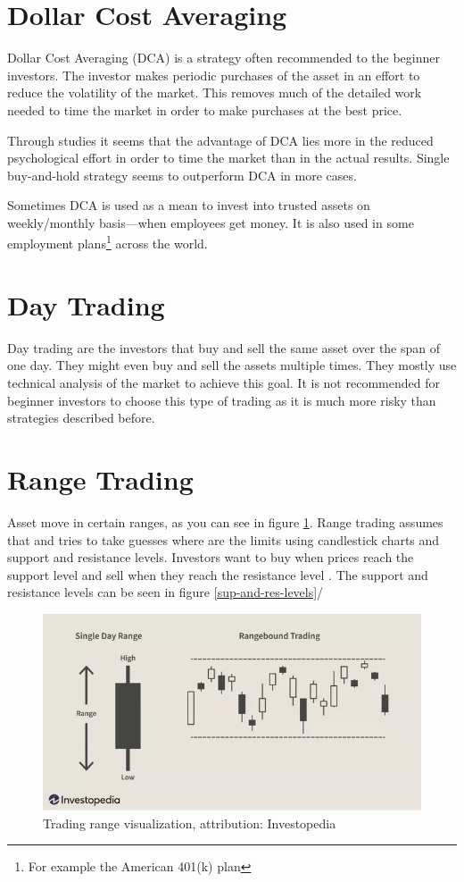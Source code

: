 \section{Dollar Cost Averaging}
Dollar Cost Averaging (DCA) is a strategy often recommended to the beginner investors. The investor makes periodic purchases of the asset in an effort to reduce the volatility of the market. This removes much of the detailed work needed to time the market in order to make purchases at the best price.

Through studies \cite{DCA-study} it seems that the advantage of DCA lies more in the reduced psychological effort in order to time the market than in the actual results. Single buy-and-hold strategy seems to outperform DCA in more cases.

Sometimes DCA is used as a mean to invest into trusted assets on weekly/monthly basis---when employees get money. It is also used in some employment plans\footnote{For example the American 401(k) plan} across the world.

\section{Day Trading}
Day trading are the investors that buy and sell the same asset over the span of one day. They might even buy and sell the assets multiple times. They mostly use technical analysis of the market to achieve this goal. It is not recommended for beginner investors to choose this type of trading as it is much more risky than strategies described before.

\section{Range Trading}
Asset move in certain ranges, as you can see in figure \ref{trading-range-figure}. Range trading assumes that and tries to take guesses where are the limits using candlestick charts and support and resistance levels. Investors want to buy when prices reach the support level and sell when they reach the resistance level \cite{5types-of-daytrading}. The support and resistance levels can be seen in figure \ref{sup-and-res-levels}/

\begin{figure}[h!]
    \label{trading-range-figure}
    \centering
    \includegraphics[width=\columnwidth]{figures/trading-range.png}
    \caption{Trading range visualization, attribution: Investopedia}
\end{figure}

